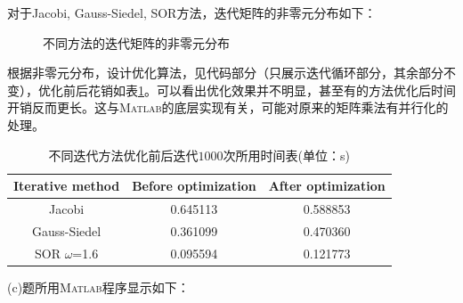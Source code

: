 \documentclass[12pt,a4paper,UTF8]{ctexart}
\begin{document}
\begin{enumerate}
          对于Jacobi, Gauss-Siedel, SOR方法，迭代矩阵的非零元分布如下：
          \begin{figure}[H] \centering
              \caption{不同方法的迭代矩阵的非零元分布}
              \label{fig}
          \end{figure}


          根据非零元分布，设计优化算法，见代码部分（只展示迭代循环部分，其余部分不变），优化前后花销如表\ref{tb1}。可以看出优化效果并不明显，甚至有的方法优化后时间开销反而更长。这与\textsc{Matlab}的底层实现有关，可能对原来的矩阵乘法有并行化的处理。
          \begin{table}[H]
              \centering
              \begin{tabular}{|c|c|c|}
                  \hline
                  \textbf{Iterative method} & \textbf{Before optimization} & \textbf{After optimization} \\ \hline
                  Jacobi                    & 0.645113                     & 0.588853                    \\ \hline
                  Gauss-Siedel              & 0.361099                     & 0.470360                    \\ \hline
                  SOR $\omega$=1.6          & 0.095594                     & 0.121773                    \\ \hline
              \end{tabular}
              \caption{不同迭代方法优化前后迭代$1000$次所用时间表(单位：s)}
              \label{tb1}
          \end{table}
          (c)题所用\textsc{Matlab}程序显示如下：
          \begin{lstlisting}[frame=single]
% Jacobi Part:


\end{lstlisting}
\end{enumerate}
\end{document}
